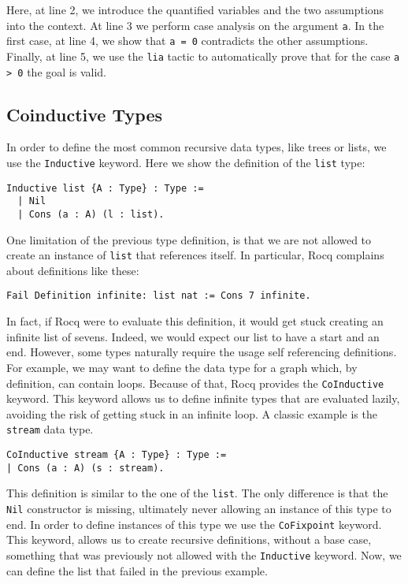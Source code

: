Here, at line 2, we introduce the quantified variables and the two assumptions into the context. At line 3 we perform case analysis on the argument \texttt a. In the first case, at line 4, we show that \texttt{a = 0} contradicts the other assumptions. Finally, at line 5, we use the \texttt{lia} tactic to automatically prove that for the case \texttt{a > 0} the goal is valid.

\subsection{Coinductive Types}
\label{subsec:coind}

In order to define the most common recursive data types, like trees or lists, we use the \texttt{Inductive} keyword. Here we show the definition of the \texttt{list} type:

\begin{lstlisting}[style=Rocq]
Inductive list {A : Type} : Type :=
  | Nil
  | Cons (a : A) (l : list).
\end{lstlisting}

One limitation of the previous type definition, is that we are not allowed to create an instance of \texttt{list} that references itself. In particular, Rocq complains about definitions like these:

\begin{lstlisting}[style=Rocq]
Fail Definition infinite: list nat := Cons 7 infinite.
\end{lstlisting}

In fact, if Rocq were to evaluate this definition, it would get stuck creating an infinite list of sevens. Indeed, we would expect our list to have a start and an end.
However, some types naturally require the usage self referencing definitions. For example, we may want to define the data type for a graph which, by definition, can contain loops. Because of that, Rocq provides the \texttt{CoInductive} keyword. This keyword allows us to define infinite types that are evaluated lazily, avoiding the risk of getting stuck in an infinite loop. A classic example is the \texttt{stream} data type.

\begin{lstlisting}[style=Rocq]
CoInductive stream {A : Type} : Type :=
| Cons (a : A) (s : stream).
\end{lstlisting}

This definition is similar to the one of the \texttt{list}. The only difference is that the \texttt{Nil} constructor is missing, ultimately never allowing an instance of this type to end. In order to define instances of this type we use the \texttt{CoFixpoint} keyword. This keyword, allows us to create recursive definitions, without a base case, something that was previously not allowed with the \texttt{Inductive} keyword. Now, we can define the list that failed in the previous example.


